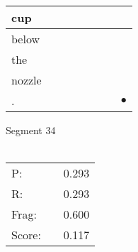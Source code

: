 \documentclass[landscape]{article}
\newcommand{\ssp}{\hspace{2pt}}
\newcommand{\mex}{\cellcolor{g}$\bullet$}
\begin{document}
\begin{tabular}{|l|p{10pt}|p{10pt}|p{10pt}|p{10pt}|p{10pt}|p{10pt}|p{10pt}|}
\hline
\ssp cup \ssp&\hspace{2pt}&\hspace{2pt}&\hspace{2pt}&\hspace{2pt}&\hspace{2pt}&\hspace{2pt}&\hspace{2pt}\\
\hline
\ssp below \ssp&\hspace{2pt}&\hspace{2pt}&\hspace{2pt}&\hspace{2pt}&\hspace{2pt}&\hspace{2pt}&\hspace{2pt}\\
\hline
\ssp the \ssp&\hspace{2pt}&\hspace{2pt}&\hspace{2pt}&\hspace{2pt}&\hspace{2pt}&\hspace{2pt}&\hspace{2pt}\\
\hline
\ssp nozzle \ssp&\hspace{2pt}&\hspace{2pt}&\hspace{2pt}&\hspace{2pt}&\hspace{2pt}&\hspace{2pt}&\hspace{2pt}\\
\hline
\ssp \cellcolor{ref6}. \ssp&\hspace{2pt}&\hspace{2pt}&\hspace{2pt}&\hspace{2pt}&\hspace{2pt}&\hspace{2pt}&\hspace{2pt}\mex\\
\hline
\end{tabular}

\vspace{6pt}
\noindent Segment 34\\\\
\noindent\begin{tabular}{lm{12pt}r}
\hline
P:&&0.293\\
R:&&0.293\\
Frag:&&0.600\\
Score:&&0.117\\
\end{tabular}
\end{document}
